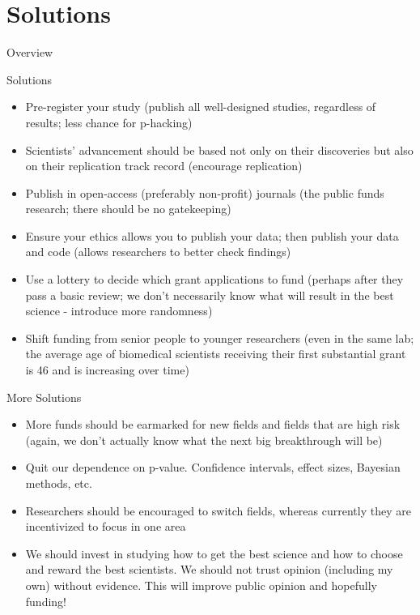 \documentclass{beamer}
\begin{document}
\section{Solutions}
\begin{frame}{Overview}
\end{frame}
\begin{frame}{Solutions}

	\begin{itemize}
		\item Pre-register your study (publish all well-designed studies, regardless of results; less chance for p-hacking)
		\item<2-> Scientists' advancement should be based not only on their discoveries but also on their replication track record (encourage replication)
		\item<3-> Publish in open-access (preferably non-profit) journals (the public funds research; there should be no gatekeeping)
		\item<4-> Ensure your ethics allows you to publish your data; then publish your data and code (allows researchers to better check findings) 
		\item<5-> Use a lottery to decide which grant applications to fund (perhaps after they pass a basic review; we don't necessarily know what will result in the best science - introduce more randomness)
		\item<6-> Shift funding from senior people to younger researchers (even in the same lab; the average age of biomedical scientists receiving their first substantial grant is 46 and is increasing over time)
	\end{itemize}
	
\end{frame}

\begin{frame}{More Solutions}

	\begin{itemize}
		\item More funds should be earmarked for new fields and fields that are high risk (again, we don't actually know what the next big breakthrough will be)
		\item<2-> Quit our dependence on p-value. Confidence intervals, effect sizes, Bayesian methods, etc.
		\item<3-> Researchers should be encouraged to switch fields, whereas currently they are incentivized to focus in one area
		\item<4-> We should invest in studying how to get the best science and how to choose and reward the best scientists. We should not trust opinion (including my own) without evidence. This will improve public opinion and hopefully funding!
	\end{itemize}
	
\end{frame}
\end{document}
